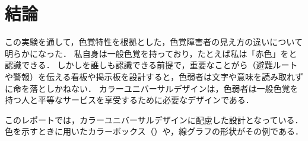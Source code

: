\section{結論}
この実験を通して，色覚特性を根拠とした，色覚障害者の見え方の違いについて明らかになった．
私自身は一般色覚を持っており，たとえば私は「赤色」をと認識できる．
しかしを誰しも認識できる前提で，重要なことがら（避難ルートや警報）を伝える看板や掲示板を設計すると，色弱者は文字や意味を読み取れずに命を落としかねない．
カラーユニバーサルデザインは，色弱者は一般色覚を持つ人と平等なサービスを享受するために必要なデザインである．\par
このレポートでは，カラーユニバーサルデザインに配慮した設計となっている．色を示すときに用いたカラーボックス（）や，線グラフの形状がその例である．

